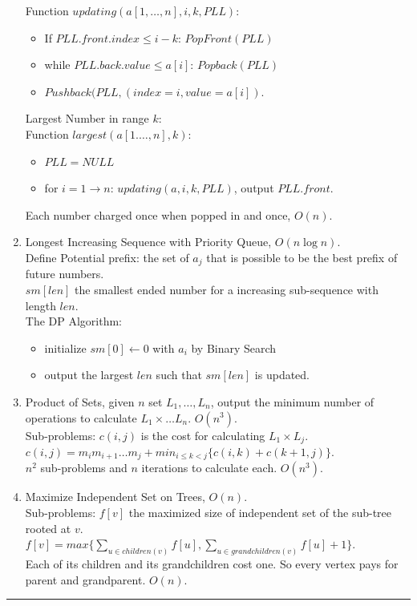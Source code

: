 \documentclass[10pt, a4paper, twocolumn]{article}
\begin{document}
\begin{enumerate}[leftmargin = 12pt, topsep = 0pt, itemsep=0pt, partopsep = 0pt]
        Function $updating(a[1,\dots,n],i,k,PLL)$:
        \begin{itemize}[leftmargin = 12pt, topsep = 0pt, itemsep=0pt, partopsep = 0pt]
        \item If $PLL.front.index\leq i-k$: $PopFront(PLL)$
        \item while $PLL.back.value \leq a[i]$: $Popback(PLL)$
        \item $Pushback(PLL,(index=i,value=a[i])$.
        \end{itemize}
        Largest Number in range $k$:\\
        Function $largest(a[1.\dots,n],k)$:
        \begin{itemize}[leftmargin = 12pt, topsep = 0pt, itemsep=0pt, partopsep = 0pt]
        \item $PLL = NULL$
        \item for $i=1\to n$: $updating(a,i,k,PLL)$, output $PLL.front$.
        \end{itemize}
        Each number charged once when popped in and once, $O(n)$.
    \item Longest Increasing Sequence with Priority Queue, $O(n\log n)$.\\
        Define Potential prefix: the set of $a_j$ that is possible to be the best prefix of future numbers.\\
        $sm[len]$ the smallest ended number for a increasing sub-sequence with length $len$.\\
        The DP Algorithm:
        \begin{itemize}[leftmargin = 12pt, topsep = 0pt, itemsep=0pt, partopsep = 0pt]
        \item initialize $sm[0]\leftarrow 0$ with $a_i$ by Binary Search
        \item output the largest $len$ such that $sm[len]$ is updated.
        \end{itemize}
    \item Product of Sets, given $n$ set $L_1,\dots, L_n$, output the     minimum number of operations to calculate $L_1\times \dots       L_n$. $O(n^3)$.\\
        Sub-problems: $c(i,j)$ is the cost for calculating $L_1\times L_j$.\\
        $c(i,j)=m_i m_{i+1} \dots m_j + min_{i\leq k<j}\{ c(i,k) + c(k+1,j) \}$.\\
        $n^2$ sub-problems and $n$ iterations to calculate each. $O(n^3)$.
    \item Maximize Independent Set on Trees, $O(n)$.\\
        Sub-problems: $f[v]$ the maximized size of independent set of the sub-tree rooted at $v$.\\
        $f[v]= max\{ \sum_{u\in children(v)}f[u], \sum_{u\in grandchildren(v)}f[u] + 1 \}$.\\
        Each of its children and its grandchildren cost one. So every vertex pays for parent and grandparent. $O(n)$.
\end{enumerate}
\vspace{0.1cm}
\hrule
\end{document}

